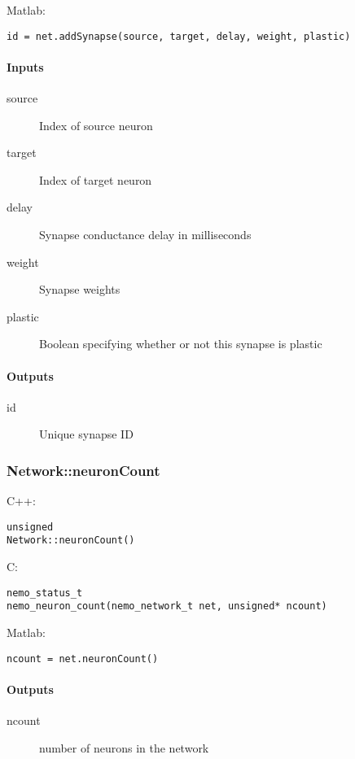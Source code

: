 \noindent Matlab:
\begin{lstlisting}[aboveskip=2pt]
id = net.addSynapse(source, target, delay, weight, plastic)
\end{lstlisting}
\paragraph{Inputs}
\begin{description}
\item[source] Index of source neuron
\item[target] Index of target neuron
\item[delay] Synapse conductance delay in milliseconds
\item[weight] Synapse weights
\item[plastic] Boolean specifying whether or not this synapse is plastic
\end{description}
\paragraph{Outputs}
\begin{description}
\item[id] Unique synapse ID
\end{description}

\clearpage
\subsubsection*{Network::neuronCount}
\label{fn: neuronCount}



\noindent C++:
\begin{lstlisting}[aboveskip=2pt]
unsigned
Network::neuronCount()
\end{lstlisting}

\noindent C:
\begin{lstlisting}[aboveskip=2pt]
nemo_status_t
nemo_neuron_count(nemo_network_t net, unsigned* ncount)
\end{lstlisting}

\noindent Matlab:
\begin{lstlisting}[aboveskip=2pt]
ncount = net.neuronCount()
\end{lstlisting}
\paragraph{Outputs}
\begin{description}
\item[ncount] number of neurons in the network
\end{description}

